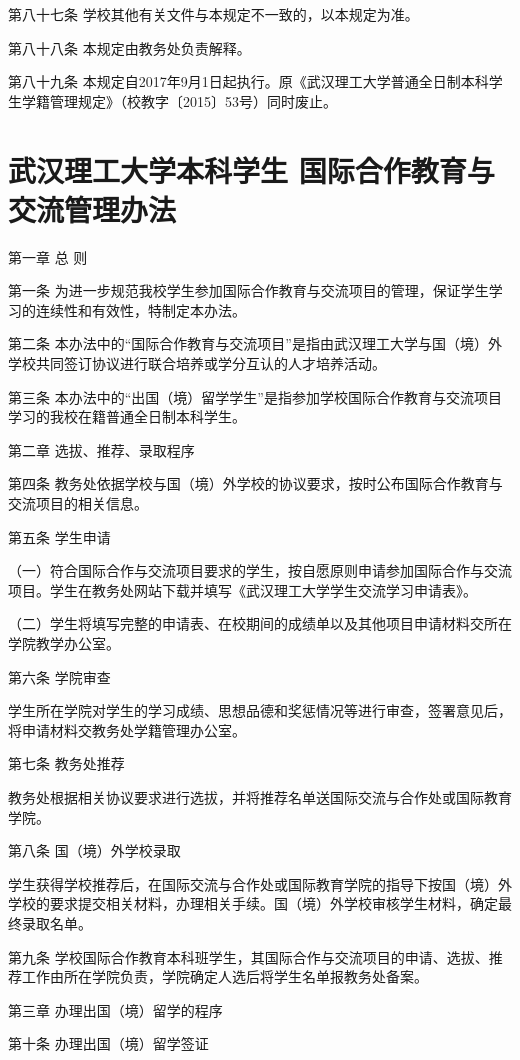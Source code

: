 \documentclass[UTF8,12pt,a4paper]{report}
\begin{document}
第八十七条  学校其他有关文件与本规定不一致的，以本规定为准。

第八十八条  本规定由教务处负责解释。

第八十九条  本规定自2017年9月1日起执行。原《武汉理工大学普通全日制本科学生学籍管理规定》（校教字〔2015〕53号）同时废止。

\chapter{武汉理工大学本科学生 国际合作教育与交流管理办法}
第一章 总 则

第一条 为进一步规范我校学生参加国际合作教育与交流项目的管理，保证学生学习的连续性和有效性，特制定本办法。

第二条 本办法中的“国际合作教育与交流项目”是指由武汉理工大学与国（境）外学校共同签订协议进行联合培养或学分互认的人才培养活动。

第三条 本办法中的“出国（境）留学学生”是指参加学校国际合作教育与交流项目学习的我校在籍普通全日制本科学生。

第二章 选拔、推荐、录取程序

第四条 教务处依据学校与国（境）外学校的协议要求，按时公布国际合作教育与交流项目的相关信息。

第五条 学生申请

（一）符合国际合作与交流项目要求的学生，按自愿原则申请参加国际合作与交流项目。学生在教务处网站下载并填写《武汉理工大学学生交流学习申请表》。

（二）学生将填写完整的申请表、在校期间的成绩单以及其他项目申请材料交所在学院教学办公室。

第六条 学院审查

学生所在学院对学生的学习成绩、思想品德和奖惩情况等进行审查，签署意见后，将申请材料交教务处学籍管理办公室。

第七条 教务处推荐

教务处根据相关协议要求进行选拔，并将推荐名单送国际交流与合作处或国际教育学院。

第八条 国（境）外学校录取

学生获得学校推荐后，在国际交流与合作处或国际教育学院的指导下按国（境）外学校的要求提交相关材料，办理相关手续。国（境）外学校审核学生材料，确定最终录取名单。

第九条 学校国际合作教育本科班学生，其国际合作与交流项目的申请、选拔、推荐工作由所在学院负责，学院确定人选后将学生名单报教务处备案。

第三章 办理出国（境）留学的程序

第十条 办理出国（境）留学签证
\end{document}
